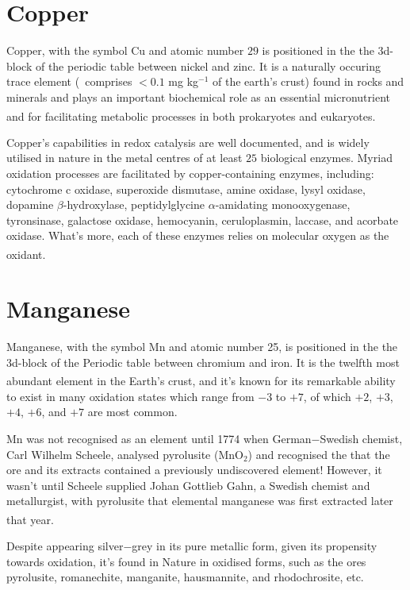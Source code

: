 \section{Copper}

Copper, with the symbol Cu and atomic number $29$ is positioned in the the $3$d-block of the periodic table between nickel and zinc. It is a naturally occuring trace element (\ie\, comprises $<0.1$ mg kg$^{-1}$ of the earth's crust) found in rocks and minerals and plays an important biochemical role as an essential micronutrient and for facilitating metabolic processes in both prokaryotes and eukaryotes.\textsuperscript{\cite{flemming:1989}}

Copper's capabilities in redox catalysis are well documented, and is widely utilised in nature in the metal centres of at least $25$ biological enzymes. Myriad oxidation processes are facilitated by copper-containing enzymes, including: cytochrome c oxidase, superoxide dismutase, amine oxidase, lysyl oxidase, dopamine $\beta$-hydroxylase, peptidylglycine $\alpha$-amidating monooxygenase, tyronsinase, galactose oxidase, hemocyanin, ceruloplasmin, laccase, and acorbate oxidase. What's more, each of these enzymes relies on molecular oxygen as the oxidant.\textsuperscript{\cite{tishchenko:2016}}

\section{Manganese}

Manganese, with the symbol Mn and atomic number 25, is positioned in the the 3d-block of the Periodic table between chromium and iron. It is the twelfth most abundant element in the Earth's crust,\textsuperscript{\cite{costa:2014}} and it's known for its remarkable ability to exist in many oxidation states which range from $-3$ to $+7$, of which $+2$, $+3$, $+4$, $+6$, and $+7$ are most common.

Mn was not recognised as an element until 1774 when German$-$Swedish chemist, Carl Wilhelm Scheele, analysed pyrolusite (MnO$_2$) and recognised the that the ore and its extracts contained a previously undiscovered element! However, it wasn't until Scheele supplied Johan Gottlieb Gahn, a Swedish chemist and metallurgist, with pyrolusite that elemental manganese was first extracted later that year.\textsuperscript{\cite{kemmitt:1973}} 

Despite appearing silver$-$grey in its pure metallic form, given its propensity towards oxidation, it's found in Nature in oxidised forms, such as the ores pyrolusite, romanechite, manganite, hausmannite, and rhodochrosite, etc. 

